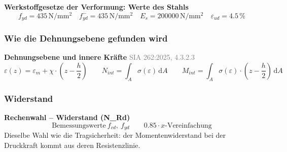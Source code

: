 \documentclass[11pt,a4paper]{article}
\newcommand{\normref}[1]{{\small\textcolor{gray}{#1}}}
\begin{document}
\noindent\textbf{Werkstoffgesetze der Verformung: Werte des Stahls}
\begin{equation*}
f_{yd} = 435\,\mathrm{N}/\mathrm{mm}^{2} \quad f_{yd}^{-} = 435\,\mathrm{N}/\mathrm{mm}^{2} \quad E_s = 200000\,\mathrm{N}/\mathrm{mm}^{2} \quad \varepsilon_{ud} = 4.5\,\%
\end{equation*}
\subsubsection{Wie die Dehnungsebene gefunden wird}
\noindent\textbf{Dehnungsebene und innere Kräfte} \hfill \normref{SIA 262:2025, 4.3.2.3}
\begin{equation*}
\varepsilon(z) = \varepsilon_m + \chi \cdot \left(z - \frac{h}{2}\right) \qquad N_{int} = \int_A \sigma\left(\varepsilon\right)\,\mathrm{d}A \qquad M_{int} = \int_A \sigma\left(\varepsilon\right) \cdot \left(z - \frac{h}{2}\right)\,\mathrm{d}A
\end{equation*}
\subsubsection{Widerstand}
\noindent\textbf{Rechenwahl – Widerstand (N\_Rd)}
\begin{equation*}
\text{Bemessungswerte}\ f_{cd},\ f_{yd} \qquad 0.85 \cdot x\text{-Vereinfachung}
\end{equation*}
Dieselbe Wahl wie die Tragsicherheit: der Momentenwiderstand bei der Druckkraft kommt aus deren Resistenzlinie.
\end{document}
